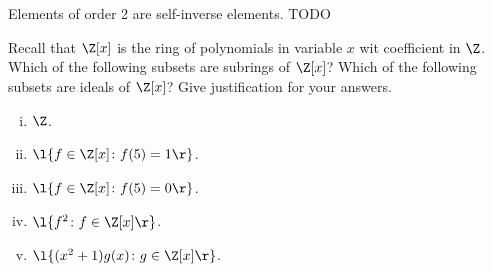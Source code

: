 \documentclass[a4paper]{article}
\begin{document}
\subsection{~} %

Elements of order 2 are self-inverse elements. TODO



\renewcommand{\thesubsection}{Q\arabic{section}~(\roman{subsection})}

\begin{questionbody}
Recall that $\Z[x]$ is the ring of polynomials in variable $x$ wit coefficient in $\Z$. Which of the following subsets are subrings of $\Z[x]$? Which of the following subsets are ideals of $\Z[x]$? Give justification for your answers.
\begin{enumerate}[(i)]
\item $\Z$.
\item $\l\{ f \in \Z[x] \colon f(5) = 1 \r\}$.
\item $\l\{ f \in \Z[x] \colon f(5) = 0 \r\}$.
\item $\l\{ f^2 \colon f \in \Z[x] \r\}$.
\item $\l\{ (x^2 + 1) g(x) \colon g \in \Z[x] \r\}$.
\end{enumerate}
\end{questionbody}

\subsection{~} %
\subsection{~} %
\subsection{~} %
\subsection{~} %
\subsection{~} %
\end{document}
